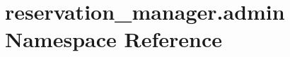 \hypertarget{namespacereservation__manager_1_1admin}{\section{reservation\-\_\-manager.\-admin Namespace Reference}
\label{namespacereservation__manager_1_1admin}
}
